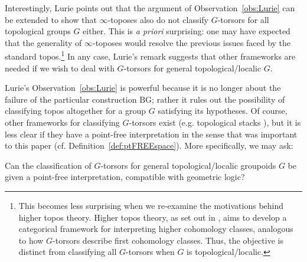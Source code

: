 \documentclass[a4paper, 11pt,reqno]{amsart}
\newcommand{\baseS}{\mathcal{S}}
\newcommand{\BG}{\mathrm{BG}}
\begin{document}
\begin{discussion}\label{dis:inftyTOPOSclassification} Interestingly, Lurie \cite{LuriePrincipalBundle} points out that the argument of Observation~\ref{obs:Lurie} can be extended to show that $\infty$-toposes also do not classify $G$-torsors for all topological groups $G$ either. This is \emph{a priori} surprising: one may have expected that the generality of $\infty$-toposes would resolve the previous issues faced by the standard topos.\footnote{This becomes less surprising when we re-examine the motivations behind higher topos theory. Higher topos theory, as set out in \cite{LurieHigherTopos}, aims to develop a categorical framework for interpreting higher cohomology classes, analogous to how $G$-torsors describe first cohomology classes. Thus, the objective is distinct from classifying all $G$-torsors when $G$ is topological/localic.
	} In any case, Lurie's remark suggests that other frameworks are needed if we wish to deal with $G$-torsors for general topological/localic $G$.
\end{discussion}

Lurie's Observation~\ref{obs:Lurie} is powerful because it is no longer about the failure of the particular construction $\BG$; rather it rules out the possibility of classifying topos altogether for a group $G$ satisfying its hypotheses. Of course, other frameworks for classifying $G$-torsors exist  (e.g. topological stacks \cite{Noohi}), but it is less clear if they have a point-free interpretation in the sense that was important to this paper (cf. Definition~\ref{def:ptFREEspace}). More specifically, we may ask:

\begin{problem}\label{prob:Gbundles} Can the classification of $G$-torsors for general topological/localic groupoids $G$ be given a point-free interpretation, compatible with geometric logic?
\end{problem}
\end{document}
